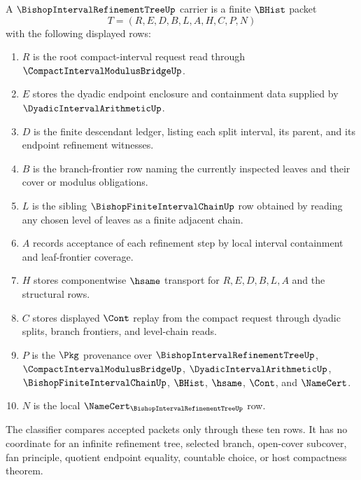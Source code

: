 \begin{definition}
\label{def:bishop-interval-refinement-tree-carrier}
A $\BishopIntervalRefinementTreeUp$ carrier is a finite $\BHist$ packet
$$
T=(R,E,D,B,L,A,H,C,P,N)
$$
with the following displayed rows:
\begin{enumerate}
\item $R$ is the root compact-interval request read through $\CompactIntervalModulusBridgeUp$.
\item $E$ stores the dyadic endpoint enclosure and containment data supplied by $\DyadicIntervalArithmeticUp$.
\item $D$ is the finite descendant ledger, listing each split interval, its parent, and its endpoint refinement witnesses.
\item $B$ is the branch-frontier row naming the currently inspected leaves and their cover or modulus obligations.
\item $L$ is the sibling $\BishopFiniteIntervalChainUp$ row obtained by reading any chosen level of leaves as a finite adjacent chain.
\item $A$ records acceptance of each refinement step by local interval containment and leaf-frontier coverage.
\item $H$ stores componentwise $\hsame$ transport for $R,E,D,B,L,A$ and the structural rows.
\item $C$ stores displayed $\Cont$ replay from the compact request through dyadic splits, branch frontiers, and level-chain reads.
\item $P$ is the $\Pkg$ provenance over $\BishopIntervalRefinementTreeUp$, $\CompactIntervalModulusBridgeUp$, $\DyadicIntervalArithmeticUp$, $\BishopFiniteIntervalChainUp$, $\BHist$, $\hsame$, $\Cont$, and $\NameCert$.
\item $N$ is the local $\NameCert_{\BishopIntervalRefinementTreeUp}$ row.
\end{enumerate}
The classifier compares accepted packets only through these ten rows. It has no coordinate for an infinite refinement tree, selected branch, open-cover subcover, fan principle, quotient endpoint equality, countable choice, or host compactness theorem.
\end{definition}

